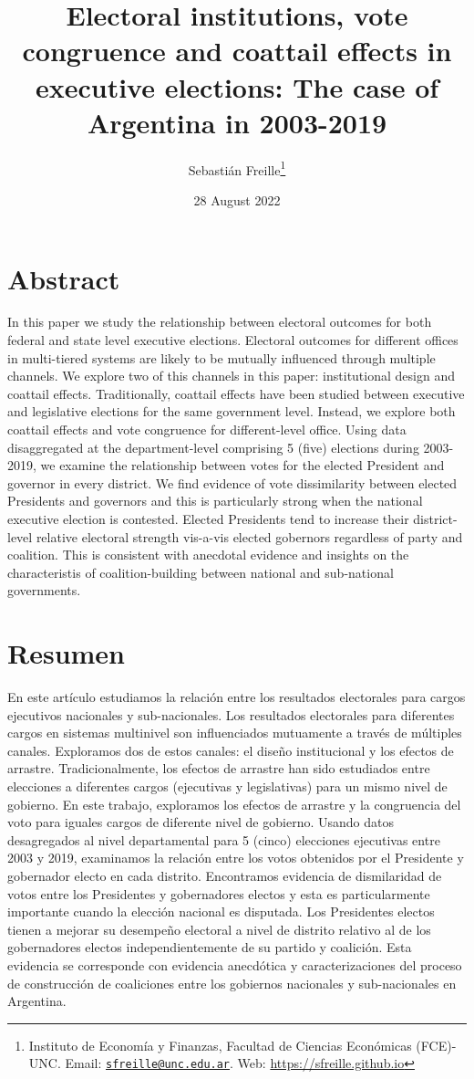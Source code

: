 \documentclass[
  12pt,
]{article}
\title{Electoral institutions, vote congruence and coattail effects in
executive elections: The case of Argentina in 2003-2019}
\author{Sebastián Freille\footnote{Instituto de Economía y Finanzas,
  Facultad de Ciencias Económicas (FCE)-UNC. Email:
  \href{mailto:sfreille@unc.edu.ar}{\nolinkurl{sfreille@unc.edu.ar}}.
  Web: \url{https://sfreille.github.io}}}
\date{28 August 2022}
\begin{document}
\maketitle

\hypertarget{abstract}{%
\section{Abstract}\label{abstract}}

In this paper we study the relationship between electoral outcomes for
both federal and state level executive elections. Electoral outcomes for
different offices in multi-tiered systems are likely to be mutually
influenced through multiple channels. We explore two of this channels in
this paper: institutional design and coattail effects. Traditionally,
coattail effects have been studied between executive and legislative
elections for the same government level. Instead, we explore both
coattail effects and vote congruence for different-level office. Using
data disaggregated at the department-level comprising 5 (five) elections
during 2003-2019, we examine the relationship between votes for the
elected President and governor in every district. We find evidence of
vote dissimilarity between elected Presidents and governors and this is
particularly strong when the national executive election is contested.
Elected Presidents tend to increase their district-level relative
electoral strength vis-a-vis elected gobernors regardless of party and
coalition. This is consistent with anecdotal evidence and insights on
the characteristis of coalition-building between national and
sub-national governments.

\hypertarget{resumen}{%
\section{Resumen}\label{resumen}}

En este artículo estudiamos la relación entre los resultados electorales
para cargos ejecutivos nacionales y sub-nacionales. Los resultados
electorales para diferentes cargos en sistemas multinivel son
influenciados mutuamente a través de múltiples canales. Exploramos dos
de estos canales: el diseño institucional y los efectos de arrastre.
Tradicionalmente, los efectos de arrastre han sido estudiados entre
elecciones a diferentes cargos (ejecutivas y legislativas) para un mismo
nivel de gobierno. En este trabajo, exploramos los efectos de arrastre y
la congruencia del voto para iguales cargos de diferente nivel de
gobierno. Usando datos desagregados al nivel departamental para 5
(cinco) elecciones ejecutivas entre 2003 y 2019, examinamos la relación
entre los votos obtenidos por el Presidente y gobernador electo en cada
distrito. Encontramos evidencia de dismilaridad de votos entre los
Presidentes y gobernadores electos y esta es particularmente importante
cuando la elección nacional es disputada. Los Presidentes electos tienen
a mejorar su desempeño electoral a nivel de distrito relativo al de los
gobernadores electos independientemente de su partido y coalición. Esta
evidencia se corresponde con evidencia anecdótica y caracterizaciones
del proceso de construcción de coaliciones entre los gobiernos
nacionales y sub-nacionales en Argentina.
\end{document}
